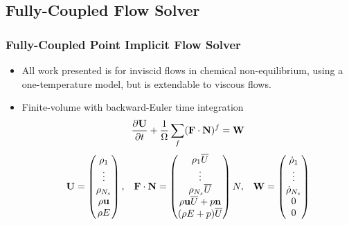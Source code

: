 \documentclass{beamer}
\begin{document}
\subsection{Fully-Coupled Flow Solver}
\begin{frame}
  \frametitle{Fully-Coupled Point Implicit Flow Solver}
  \begin{itemize}
    \item All work presented is for inviscid flows in chemical non-equilibrium,
      using a one-temperature model, but is extendable to viscous flows.
    \item Finite-volume with backward-Euler time integration
    \begin{equation*}
    	\label{inv_flux_fv}
    	\frac{\partial \mathbf U}{\partial t}
    	 + \frac{1}{\Omega}\sum\limits_{f}(\mathbf F \cdot \mathbf{N})^f = \mathbf W
    \end{equation*}
    \begin{equation*}
    	\begin{matrix}
    	\mathbf U=\begin{pmatrix}
       		\rho_1\\
    		\vdots \\
    		\rho_{N_s} \\
    		\rho \mathbf u \\
    		\rho E \\
    	\end{pmatrix},      &
     	\mathbf F \cdot \mathbf{N} = \begin{pmatrix}
    		\rho_1  \overline{U} \\
    		\vdots \\
    		\rho_{N_s} \overline{U} \\
    		\rho \mathbf u \overline{U} + p \mathbf{n} \\
    		(\rho E + p) \overline{U} \\
    	\end{pmatrix} N,    &
     	\mathbf W = \begin{pmatrix}
        \dot\rho_1\\
    		\vdots \\
    		\dot\rho_{N_s} \\
        0 \\
        0
      \end{pmatrix}

  	\end{matrix}
  \end{equation*}

  \end{itemize}
\end{frame}
\end{document}
